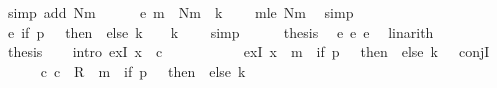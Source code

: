 \begin{isabellebody}
\ {\isacharparenleft}{\kern0pt}simp\ add{\isacharcolon}{\kern0pt}\ Nm{\isacharparenright}{\kern0pt}\isanewline
\ \ \ \ \isamarkupfalse%
\ e{}{\isacharcolon}{\kern0pt}\ {\isachardoublequoteopen}m{}\ {\isasymle}\ Nm\ {\isacharasterisk}{\kern0pt}\ {\isacharparenleft}{\kern0pt}{\isacharquery}{\kern0pt}k\ {\isacharplus}{\kern0pt}\ {}{\isacharparenright}{\kern0pt}{\isachardoublequoteclose}\ \isamarkupfalse%
\ m{}{\isacharunderscore}{\kern0pt}le\ Nm\ \isamarkupfalse%
\ simp\isanewline
\ \ \ \ \isamarkupfalse%
\ e{}{\isacharcolon}{\kern0pt}\ {\isachardoublequoteopen}{\isacharparenleft}{\kern0pt}if\ {\isacharquery}{\kern0pt}p\ {\isacharequal}{\kern0pt}\ {}\ then\ {}\ else\ {\isacharquery}{\kern0pt}k\ {\isacharplus}{\kern0pt}\ {}{\isacharparenright}{\kern0pt}\ {\isasymle}\ {\isacharquery}{\kern0pt}k\ {\isacharplus}{\kern0pt}\ {}{\isachardoublequoteclose}\ \isamarkupfalse%
\ simp\isanewline
\ \ \ \ \isamarkupfalse%
\ {\isacharquery}{\kern0pt}thesis\ \isamarkupfalse%
\ e{}\ e{}\ e{}\ \isamarkupfalse%
\ linarith\isanewline
\ \ \isamarkupfalse%
\isanewline
\ \ \isamarkupfalse%
\ {\isacharquery}{\kern0pt}thesis\isanewline
\ \ \isamarkupfalse%
\ {\isacharparenleft}{\kern0pt}intro\ exI{\isacharbrackleft}{\kern0pt}\ x\ {\isacharequal}{\kern0pt}\ c{}{\isacharbrackright}{\kern0pt}\isanewline
\ \ \ \ \ \ \ \ \ \ \ exI{\isacharbrackleft}{\kern0pt}\ x\ {\isacharequal}{\kern0pt}\ {\isachardoublequoteopen}m{}\ {\isacharplus}{\kern0pt}\ {\isacharparenleft}{\kern0pt}if\ {\isacharquery}{\kern0pt}p\ {\isacharequal}{\kern0pt}\ {}\ then\ {}\ else\ {\isacharquery}{\kern0pt}k\ {\isacharplus}{\kern0pt}\ {}{\isacharparenright}{\kern0pt}{\isachardoublequoteclose}{\isacharbrackright}{\kern0pt}\ conjI{\isacharparenright}{\kern0pt}\isanewline
\ \ \ \ \isamarkupfalse%
\ {\isachardoublequoteopen}{\isacharparenleft}{\kern0pt}c{}{\isacharcomma}{\kern0pt}\ c{}{\isacharparenright}{\kern0pt}\ {\isasymin}\ R{\isacharprime}{\kern0pt}\ {\isacharcircum}{\kern0pt}{\isacharcircum}{\kern0pt}\ {\isacharparenleft}{\kern0pt}m{}\ {\isacharplus}{\kern0pt}\ {\isacharparenleft}{\kern0pt}if\ {\isacharquery}{\kern0pt}p\ {\isacharequal}{\kern0pt}\ {}\ then\ {}\ else\ {\isacharquery}{\kern0pt}k\ {\isacharplus}{\kern0pt}\ {}{\isacharparenright}{\kern0pt}{\isacharparenright}{\kern0pt}{\isachardoublequoteclose}\ \isamarkupfalse%

\end{isabellebody}
